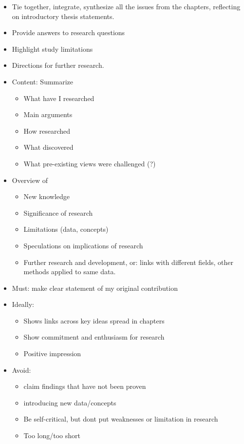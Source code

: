 \begin{itemize}
  \item Tie together, integrate, synthesize all the issues from the chapters, reflecting on introductory thesis statements.
  \item Provide answers to research questions
  \item Highlight study limitations
  \item Directions for further research.
  \item Content: Summarize
  \begin{itemize}
    \item What have I researched
    \item Main arguments
    \item How researched
    \item What discovered
    \item What pre-existing views were challenged (?)
  \end{itemize}
  \item Overview of
  \begin{itemize}
    \item New knowledge
    \item Significance of research
    \item Limitations (data, concepts)
    \item Speculations on implications of research
    \item Further research and development, or: links with different fields, other methods applied to same data.
  \end{itemize}
  \item Must: make clear statement of my original contribution
  \item Ideally:
  \begin{itemize}
    \item Shows links across key ideas spread in chapters
    \item Show commitment and enthusiasm for research
    \item Positive impression
  \end{itemize}
  \item Avoid:
  \begin{itemize}
    \item claim findings that have not been proven
    \item introducing new data/concepts
    \item Be self-critical, but dont put weaknesses or limitation in research
    \item Too long/too short
  \end{itemize}
\end{itemize}


